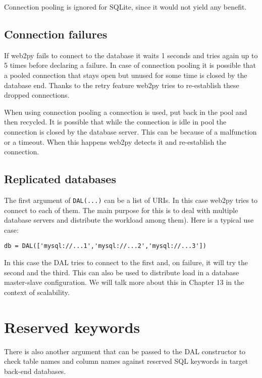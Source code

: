 \documentclass[justified,sixbynine,notoc]{tufte-book}
\def\ft{\small\tt}
\def\inxx#1{\index{#1}}
\begin{document}
\begin{fullwidth}
Connection pooling is ignored for SQLite, since it would not yield any benefit.

\goodbreak\subsection{Connection failures}

If web2py fails to connect to the database it waits 1 seconds and tries again up to 5 times before declaring a failure. In case of connection pooling it is possible that a pooled connection that stays open but unused for some time is closed by the database end. Thanks to the retry feature web2py tries to re-establish these dropped connections.

When using connection pooling a connection is used, put back in the pool and then recycled. It is possible that while the connection is idle in pool the connection is closed by the database server. This can be because of a malfunction or a timeout. When this happens web2py detects it and re-establish the connection.

\goodbreak\subsection{Replicated databases}

The first argument of {\ft DAL(...)} can be a list of URIs. In this case web2py tries to connect to each of them. The main purpose for this is to deal with multiple database servers and distribute the workload among them). Here is a typical use case:

\begin{lstlisting}
db = DAL(['mysql://...1','mysql://...2','mysql://...3'])
\end{lstlisting}

In this case the DAL tries to connect to the first and, on failure, it
will try the second and the third. This can also be used to distribute load
in a database master-slave configuration. We will talk more about this
in Chapter 13 in the context of scalability.

\goodbreak\section{Reserved keywords}

\inxx{reserved Keywords}

There is also another argument that can be passed to the DAL constructor to check table names and column names against reserved SQL keywords in target back-end databases.


\end{fullwidth}
\end{document}
